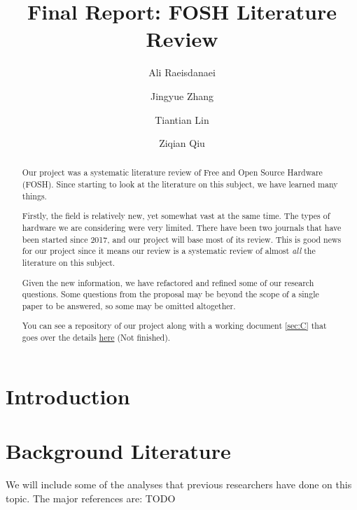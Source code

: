 \documentclass[acmtog]{acmart}
\begin{document}
\title{Final Report: FOSH Literature Review}

\author{Ali Raeisdanaei}

\author{Jingyue Zhang}

\author{Tiantian Lin}

\author{Ziqian Qiu}

\begin{abstract}
Our project was a systematic literature review of Free and Open Source Hardware (FOSH).
Since starting to look at the literature on this subject, we have learned many things. 

Firstly, the field is relatively new, yet somewhat vast at the same time. 
The types of hardware we are considering were very limited.
There have been two journals that have been started since 2017, and our project will base most of its review. 
This is good news for our project since it means our review is a systematic review of almost \textit{all} the literature on this subject. 

Given the new information, we have refactored and refined some of our research questions. 
Some questions from the proposal may be beyond the scope of a single paper to be answered, so some may be omitted altogether. 

You can see a repository of our project along with a working document \ref{sec:C} that goes over the details
\href{https://github.com/aliraeisdanaei/FOSH_Lit_Review/}{here}
(Not finished).
\end{abstract}



\maketitle

\section{Introduction}


\section{Background Literature}
We will include some of the analyses that previous researchers have done on this topic. The major references are: TODO
\end{document}
